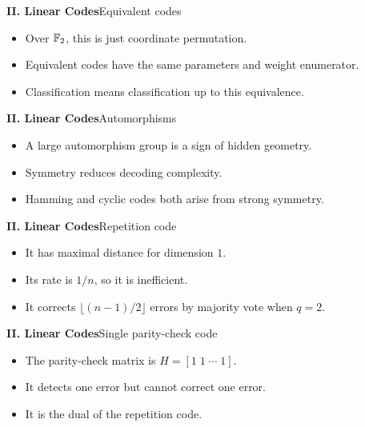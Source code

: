 \begin{frame}{\textbf{II. Linear Codes}}{Equivalent codes}
\small
{}
\begin{itemize}
  \item Over $\mathbb{F}_2$, this is just coordinate permutation.
  \item Equivalent codes have the same parameters and weight enumerator.
  \item Classification means classification up to this equivalence.
\end{itemize}
\end{frame}

\begin{frame}{\textbf{II. Linear Codes}}{Automorphisms}
\small
{}
\begin{itemize}
  \item A large automorphism group is a sign of hidden geometry.
  \item Symmetry reduces decoding complexity.
  \item Hamming and cyclic codes both arise from strong symmetry.
\end{itemize}
\end{frame}

\begin{frame}{\textbf{II. Linear Codes}}{Repetition code}
\small
{}
\begin{itemize}
  \item It has maximal distance for dimension $1$.
  \item Its rate is $1/n$, so it is inefficient.
  \item It corrects $\lfloor(n-1)/2\rfloor$ errors by majority vote when $q=2$.
\end{itemize}
\end{frame}

\begin{frame}{\textbf{II. Linear Codes}}{Single parity-check code}
\small
{}
\begin{itemize}
  \item The parity-check matrix is $H=[1\;1\;\cdots\;1]$.
  \item It detects one error but cannot correct one error.
  \item It is the dual of the repetition code.
\end{itemize}
\end{frame}

